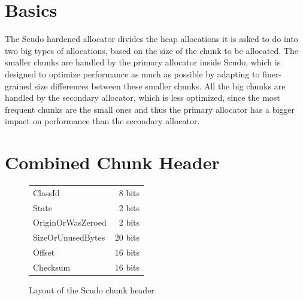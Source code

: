 \documentclass[a4paper,11pt,oneside]{report}
\begin{document}




\section{Basics}

The Scudo hardened allocator divides the heap allocations it is asked to do into two big
types of allocations, based on the size of the chunk to be allocated.  The smaller chunks
are handled by the primary allocator inside Scudo, which is designed to optimize
performance as much as possible by adapting to finer-grained size differences between
these smaller chunks. All the big chunks are handled by the secondary allocator, which is
less optimized, since the most frequent chunks are the small ones and thus the primary
allocator has a bigger impact on performance than the secondary allocator.

\section{Combined Chunk Header}

\begin{figure}[h]
  \centering
  \begin{tabular}{l r}
    \toprule
    ClassId & 8 bits \\
    State & 2 bits \\
    OriginOrWasZeroed & 2 bits \\
    SizeOrUnusedBytes & 20 bits \\
    Offset & 16 bits \\
    Checksum & 16 bits \\
    \bottomrule
  \end{tabular}
  \caption{Layout of the Scudo chunk header}\label{fig:ScudoChunkHeader}
\end{figure}
\end{document}
